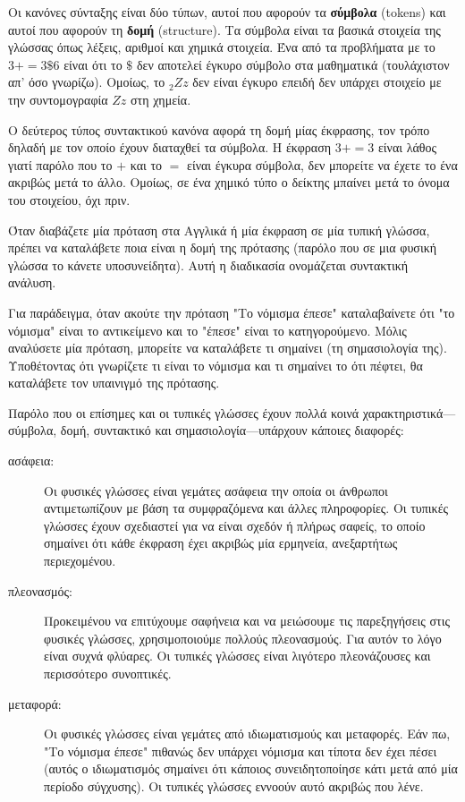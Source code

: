 \documentclass[10pt]{book}
\begin{document}
Οι κανόνες σύνταξης είναι δύο τύπων, αυτοί που αφορούν τα {\bf σύμβολα} (tokens) και αυτοί που αφορούν τη {\bf δομή} (structure). Τα σύμβολα είναι τα βασικά στοιχεία της γλώσσας όπως λέξεις, αριθμοί και χημικά στοιχεία. Ένα από τα προβλήματα με το $3 + = 3 \mbox{\$} 6$ είναι ότι το \( \$ \) δεν αποτελεί έγκυρο σύμβολο στα μαθηματικά (τουλάχιστον απ' όσο γνωρίζω). Ομοίως, το
$_2Zz$ δεν είναι έγκυρο επειδή δεν υπάρχει στοιχείο με την συντομογραφία
$Zz$ στη χημεία.


Ο δεύτερος τύπος συντακτικού κανόνα αφορά τη δομή μίας έκφρασης,
τον τρόπο δηλαδή με τον οποίο έχουν διαταχθεί τα σύμβολα.  
Η έκφραση $3 + = 3$ είναι λάθος γιατί παρόλο που το $+$ και το
$=$ είναι έγκυρα σύμβολα, δεν μπορείτε να έχετε το ένα ακριβώς
μετά το άλλο. Ομοίως, σε ένα χημικό τύπο ο δείκτης μπαίνει
μετά το όνομα του στοιχείου, όχι πριν.

Όταν διαβάζετε μία πρόταση στα Αγγλικά ή μία έκφραση σε μία τυπική
γλώσσα, πρέπει να καταλάβετε ποια είναι η δομή της πρότασης
(παρόλο που σε μια φυσική γλώσσα το κάνετε υποσυνείδητα). Αυτή
η διαδικασία ονομάζεται συντακτική ανάλυση.

Για παράδειγμα, όταν ακούτε την πρόταση "Το νόμισμα έπεσε"
καταλαβαίνετε ότι "το νόμισμα" είναι το αντικείμενο και το "έπεσε"
είναι το κατηγορούμενο. Μόλις αναλύσετε μία πρόταση, μπορείτε
να καταλάβετε τι σημαίνει (τη σημασιολογία της). Υποθέτοντας ότι 
γνωρίζετε τι είναι το νόμισμα και τι σημαίνει το ότι
πέφτει, θα καταλάβετε τον υπαινιγμό της πρότασης.

Παρόλο που οι επίσημες και οι τυπικές γλώσσες έχουν πολλά κοινά
χαρακτηριστικά---σύμβολα, δομή, συντακτικό και σημασιολογία---υπάρχουν
κάποιες διαφορές:

\begin{description}

\item[ασάφεια:] Οι φυσικές γλώσσες είναι γεμάτες ασάφεια την οποία
οι άνθρωποι αντιμετωπίζουν με βάση τα συμφραζόμενα και άλλες πληροφορίες.  
Οι τυπικές γλώσσες έχουν σχεδιαστεί για να είναι σχεδόν ή πλήρως σαφείς,
το οποίο σημαίνει ότι κάθε έκφραση έχει ακριβώς μία ερμηνεία,
ανεξαρτήτως περιεχομένου.

\item[πλεονασμός:] Προκειμένου να επιτύχουμε σαφήνεια και να μειώσουμε
τις παρεξηγήσεις στις φυσικές γλώσσες, χρησιμοποιούμε πολλούς πλεονασμούς.  
Για αυτόν το λόγο είναι συχνά φλύαρες. Οι τυπικές γλώσσες είναι λιγότερο
πλεονάζουσες και περισσότερο συνοπτικές.

\item[μεταφορά:] Οι φυσικές γλώσσες είναι γεμάτες από ιδιωματισμούς
και μεταφορές.  Εάν πω, "Το νόμισμα έπεσε" πιθανώς δεν υπάρχει νόμισμα
και τίποτα δεν έχει πέσει (αυτός ο ιδιωματισμός σημαίνει ότι κάποιος
συνειδητοποίησε κάτι μετά από μία περίοδο σύγχυσης). Οι τυπικές γλώσσες
εννοούν αυτό ακριβώς που λένε.

\end{description}
\end{document}
